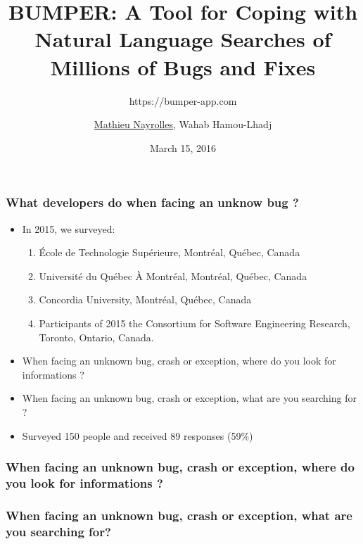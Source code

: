 \documentclass{beamer}
\title[BUMPER]{BUMPER: A Tool for Coping with Natural Language Searches of Millions of Bugs and Fixes} %
\subtitle{https://bumper-app.com}
\author[Mathieu Nayrolles]{\underline{Mathieu Nayrolles}, Wahab Hamou-Lhadj} %
\institute[Concordia] %
{
Software Behaviour Analysis (SBA) Research Lab, ECE,  Concordia, Montr\'eal, Canada
\medskip
\textit{mathieu.nayrolles@gmail.com, wahab.hamou-lhadj@concordia.ca} %
}
\date{March 15, 2016} %
\begin{document}
\begin{frame}
\titlepage %
\end{frame}


\begin{frame}
\frametitle{What developers do when facing an unknow bug ?}

\begin{itemize}
  \item In 2015, we surveyed:
  \begin{enumerate}
    \item \'Ecole de Technologie Sup\'erieure, Montr\'eal, Qu\'ebec, Canada
    \item Universit\'e du Qu\'ebec \`A Montr\'eal, Montr\'eal, Qu\'ebec, Canada
    \item Concordia University, Montr\'eal, Qu\'ebec, Canada
    \item Participants of 2015 the Consortium for Software Engineering
Research, Toronto, Ontario, Canada.
  \end{enumerate}


  \item When facing an unknown bug, crash or exception, where do you look for informations ?
  \item When facing an unknown bug, crash or exception, what are you searching for ?

\item Surveyed 150 people and received 89 responses (59\%)
\end{itemize}

\end{frame}

\begin{frame}
\frametitle{When facing an unknown bug, crash or exception, where do you look
for informations ?}





\end{frame}

\begin{frame}
\frametitle{When facing an unknown bug, crash or exception, what are you
searching for?}



\end{frame}
\end{document}
